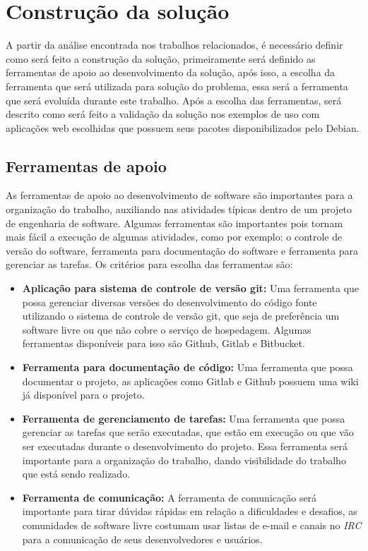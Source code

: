 \section{Construção da solução}
\label{section:construcao}

A partir da análise encontrada nos trabalhos relacionados, é necessário definir
como será feito a construção da solução, primeiramente será definido as ferramentas
de apoio ao desenvolvimento da solução, após isso, a escolha da ferramenta que será
utilizada para solução do problema, essa será a ferramenta que será evoluída
durante este trabalho. Após a escolha das ferramentas, será descrito como será
feito a validação da solução nos exemplos de uso com aplicações web escolhidas que possuem
seus pacotes disponibilizados pelo Debian.

\subsection{Ferramentas de apoio}

As ferramentas de apoio ao desenvolvimento de software são importantes para a
organização do trabalho, auxiliando nas atividades típicas dentro de um projeto
de engenharia de software. Algumas ferramentas são importantes pois tornam mais fácil
a execução de algumas atividades, como por exemplo: o controle de versão do software,
ferramenta para documentação do software e ferramenta para gerenciar as tarefas.
Os critérios para escolha das ferramentas são:

\begin{itemize}
  \item \textbf{Aplicação para sistema de controle de versão git:} Uma ferramenta que
  possa gerenciar diversas versões do desenvolvimento do código fonte utilizando
  o sistema de controle de versão git, que seja de preferência um software livre
  ou que não cobre o serviço de hospedagem. Algumas ferramentas disponíveis para
  isso são Github, Gitlab e Bitbucket.
  \item \textbf{Ferramenta para documentação de código:} Uma ferramenta que possa
  documentar o projeto, as aplicações como Gitlab e Github possuem uma wiki já disponível
  para o projeto.
  \item \textbf{Ferramenta de gerenciamento de tarefas:} Uma ferramenta que possa
  gerenciar as tarefas que serão executadas, que estão em execução ou que vão ser executadas
  durante o desenvolvimento do projeto. Essa ferramenta será importante para a
  organização do trabalho, dando visibilidade do trabalho que está sendo realizado.
  \item \textbf{Ferramenta de comunicação:} A ferramenta de comunicação será
  importante para tirar dúvidas rápidas em relação a dificuldades e desafios, as
  comunidades de software livre costumam usar listas de e-mail e canais no \textit{IRC}
  para a comunicação de seus desenvolvedores e usuários.
\end{itemize}

